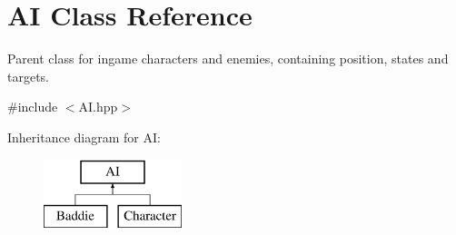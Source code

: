 \hypertarget{class_a_i}{}\section{A\+I Class Reference}
\label{class_a_i}


Parent class for ingame characters and enemies, containing position, states and targets.  




{\ttfamily \#include $<$A\+I.\+hpp$>$}

Inheritance diagram for A\+I\+:\begin{figure}[H]
\begin{center}
\leavevmode
\includegraphics[height=2.000000cm]{class_a_i}
\end{center}
\end{figure}
